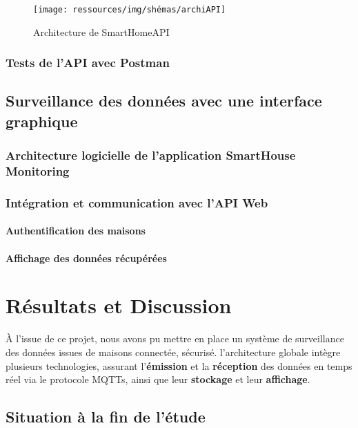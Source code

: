 \documentclass[10pt, a4paper]{report}
\begin{document}
	\begin{figure}[h!]
		\centering
		\texttt{[image: ressources/img/shémas/archiAPI]}
		\caption{Architecture de SmartHomeAPI}
		\label{fig:archAPI}
	\end{figure}
	
	
	\subsection{Tests de l'API avec Postman}
	
	\section{Surveillance des données avec une interface graphique}
	\subsection{Architecture logicielle de l'application SmartHouse Monitoring}
	\subsection{Intégration et communication avec l'API Web}
	\subsubsection{Authentification des maisons}
	\subsubsection{Affichage des données récupérées}
	
	\chapter{Résultats et Discussion}
	À l’issue de ce projet, nous avons pu mettre en place un système de surveillance des données issues de maisons connectée, sécurisé. l'architecture globale intègre plusieurs technologies, assurant l'\textbf{émission} et la \textbf{réception} des données en temps réel via le protocole MQTTs, ainsi que leur \textbf{stockage} et leur \textbf{affichage}.\\
	\section{Situation à la fin de l’étude}
\end{document}
